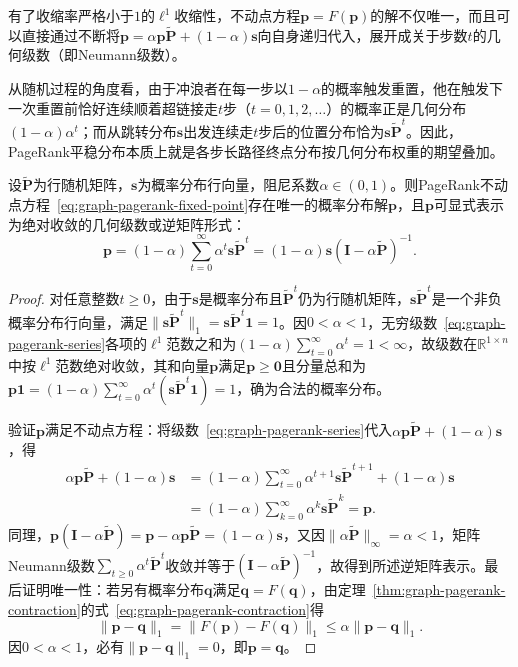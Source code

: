 有了收缩率严格小于$1$的$\ell^1$收缩性，不动点方程$\bm p=F(\bm p)$的解不仅唯一，而且可以直接通过不断将$\bm p=\alpha\bm p\widetilde{\bm P}+(1-\alpha)\bm s$向自身递归代入，展开成关于步数$t$的几何级数（即Neumann级数）。

从随机过程的角度看，由于冲浪者在每一步以$1-\alpha$的概率触发重置，他在触发下一次重置前恰好连续顺着超链接走$t$步（$t=0,1,2,\ldots$）的概率正是几何分布$(1-\alpha)\alpha^t$；而从跳转分布$\bm s$出发连续走$t$步后的位置分布恰为$\bm s\widetilde{\bm P}^t$。因此，PageRank平稳分布本质上就是各步长路径终点分布按几何分布权重的期望叠加。

\begin{theorem}[PageRank平稳分布的存在唯一性与级数展开]
\label{thm:graph-pagerank-uniqueness}
设$\widetilde{\bm P}$为行随机矩阵，$\bm s$为概率分布行向量，阻尼系数$\alpha\in(0,1)$。则PageRank不动点方程~\eqref{eq:graph-pagerank-fixed-point}存在唯一的概率分布解$\bm p$，且$\bm p$可显式表示为绝对收敛的几何级数或逆矩阵形式：
\begin{equation}
\bm{p}=(1-\alpha)\sum_{t=0}^{\infty}\alpha^t\bm{s}\widetilde{\bm{P}}^t
=(1-\alpha)\bm s(\bm I-\alpha\widetilde{\bm P})^{-1}.
\label{eq:graph-pagerank-series}
\end{equation}
\end{theorem}

\begin{proof}
对任意整数$t\geq 0$，由于$\bm s$是概率分布且$\widetilde{\bm P}^t$仍为行随机矩阵，$\bm s\widetilde{\bm P}^t$是一个非负概率分布行向量，满足$\lVert\bm s\widetilde{\bm P}^t\rVert_1=\bm s\widetilde{\bm P}^t\bm 1=1$。因$0<\alpha<1$，无穷级数~\eqref{eq:graph-pagerank-series}各项的$\ell^1$范数之和为$(1-\alpha)\sum_{t=0}^\infty\alpha^t=1<\infty$，故级数在$\mathbb R^{1\times n}$中按$\ell^1$范数绝对收敛，其和向量$\bm p$满足$\bm p\geq\bm 0$且分量总和为$\bm p\bm 1=(1-\alpha)\sum_{t=0}^\infty\alpha^t(\bm s\widetilde{\bm P}^t\bm 1)=1$，确为合法的概率分布。

验证$\bm p$满足不动点方程：将级数~\eqref{eq:graph-pagerank-series}代入$\alpha\bm p\widetilde{\bm P}+(1-\alpha)\bm s$，得
\[
\begin{aligned}
  \alpha\bm p\widetilde{\bm P}+(1-\alpha)\bm s
  &= (1-\alpha)\sum_{t=0}^\infty\alpha^{t+1}\bm s\widetilde{\bm P}^{t+1}+(1-\alpha)\bm s\\
  &= (1-\alpha)\sum_{k=0}^\infty\alpha^k\bm s\widetilde{\bm P}^k
  =\bm p.
\end{aligned}
\]
同理，$\bm p(\bm I-\alpha\widetilde{\bm P})=\bm p-\alpha\bm p\widetilde{\bm P}=(1-\alpha)\bm s$，又因$\lVert\alpha\widetilde{\bm P}\rVert_\infty=\alpha<1$，矩阵Neumann级数$\sum_{t\geq0}\alpha^t\widetilde{\bm P}^t$收敛并等于$(\bm I-\alpha\widetilde{\bm P})^{-1}$，故得到所述逆矩阵表示。最后证明唯一性：若另有概率分布$\bm q$满足$\bm q=F(\bm q)$，由定理~\ref{thm:graph-pagerank-contraction}的式~\eqref{eq:graph-pagerank-contraction}得
\[
  \lVert\bm p-\bm q\rVert_1 = \lVert F(\bm p)-F(\bm q)\rVert_1 \leq \alpha\lVert\bm p-\bm q\rVert_1.
\]
因$0<\alpha<1$，必有$\lVert\bm p-\bm q\rVert_1=0$，即$\bm p=\bm q$。
\end{proof}

